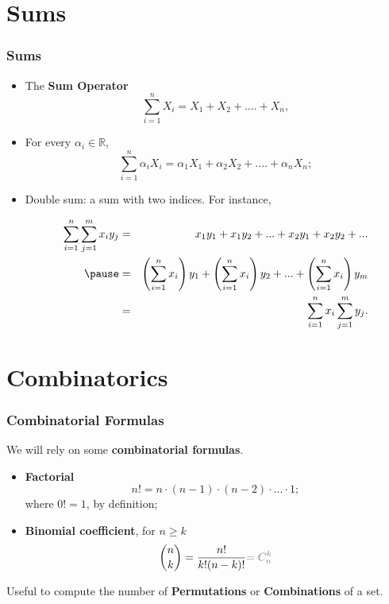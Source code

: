 \documentclass[notes=show, handout]{beamer}\usepackage[]{graphicx}\usepackage[]{color}
\newcommand{\bea}{\begin{eqnarray}}
\newcommand{\eea}{\end{eqnarray}}
\begin{document}
\section{Sums}

\begin{frame}
\frametitle{Sums}
\begin{itemize}
\item The \textbf{Sum Operator} $$\sum_{i=1}^{n} X_{i} = X_1 + X_2 +....+ X_n,$$
\pause
\item For every $\alpha_i \in \mathbb{R}$,  $$\sum_{i=1}^{n} \alpha_i X_{i} = \alpha_1 X_1 + \alpha_2 X_2 +....+ \alpha_n X_n;$$
\pause
\item Double sum: a sum with two indices. For instance,
\begin{small}
\bea
\sum_{i=1}^{n} \sum_{j=1}^{m}  x_{i}y_{j}  &=& x_1y_1 + x_1 y_2 +... +x_2y_1+ x_2y_2 +... \nonumber \\ \pause
&=& \left(\sum_{i=1}^{n} x_i\right) y_1 +  \left(\sum_{i=1}^{n} x_i\right) y_2 + ... +  \left(\sum_{i=1}^{n} x_i\right) y_m  \nonumber \\
&=& \sum_{i=1}^{n} x_i \sum_{j=1}^{m} y_j. \nonumber
\eea
\end{small}
\end{itemize}
\end{frame}

\section{Combinatorics}

\begin{frame}
\frametitle{Combinatorial Formulas}

We will rely on some \textbf{combinatorial formulas}.

\begin{itemize}
\item \textbf{Factorial}
$$
n! = n \cdot (n-1) \cdot (n-2) \cdot ... \cdot 1;
$$
where $0! =1$, by definition;
\vspace{0.4cm}
\pause
\item \textbf{Binomial coefficient}, for $n \geq k$
$$
\binom n k =\frac{n!}{k!(n-k)!} \color{gray}{=C^{k}_n}\color{black}
$$
\end{itemize}

\pause
Useful to compute the number of \textbf{Permutations} or \textbf{Combinations} of a set.
\end{frame}
\end{document}
